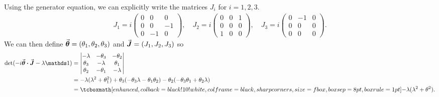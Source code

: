 Using the generator equation, we can explicitly write the matrices $J_{i}$ for $i = 1,2,3$.
\begin{eqnarray}
    \label{eq:J-matrices}
    J_{1} = i
    \begin{pmatrix}
    0 & 0 & 0 \\
    0 & 0 & -1 \\
    0 & -1 & 0
    \end{pmatrix},
    \quad
    J_{2} = i
    \begin{pmatrix}
    0 & 0 & 1 \\
    0 & 0 & 0 \\
    1 & 0 & 0
    \end{pmatrix},
    \quad
    J_{3} = i
    \begin{pmatrix}
    0 & -1 & 0 \\
    0 & 0 & 0 \\
    0 & 0 & 0
    \end{pmatrix}
.\end{eqnarray}
We can then define $\va*{\theta} = (\theta_1,\theta_2,\theta_3)$ and $\va*{J} = (J_1,J_2,J_3)$ so
\begin{align}
    \label{eq:characteristic-eq}
    {\rm det}(-i \va*{\theta} \vdot \va*{J} - \lambda \id) &= 
    \begin{vmatrix}
        -\lambda & -\theta_3 & -\theta_2 \\
        \theta_3 & -\lambda & \theta_1 \\
        \theta_2 & -\theta_1 & -\lambda
    \end{vmatrix}
    \\
                                                           &=
    -\lambda(\lambda^2 + \theta_1^2) + \theta_3(-\theta_3\lambda - \theta_1\theta_2) - \theta_2(-\theta_3\theta_1 + \theta_2\lambda) \\
                                                           &= \eqbox{-\lambda(\lambda^2 + \theta^2)}
.\end{align}





